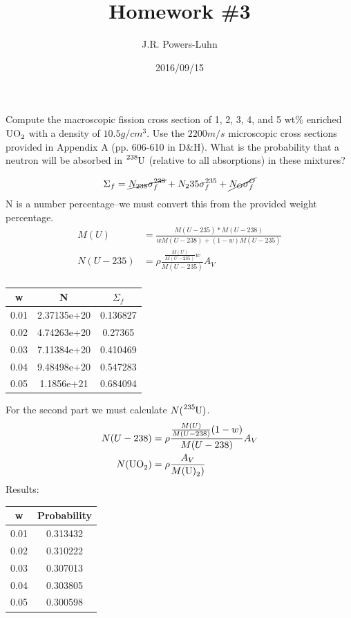 \documentclass{hw}
\author{J.R. Powers-Luhn}
\date{2016/09/15}
\title{Homework \#3}
\begin{document}
\problem{}
	Compute the macroscopic fission cross section of 1, 2, 3, 4, and 5 wt\% enriched $ \ce{UO_2} $ with a density of $ 10.5g/cm^3 $. Use the $ 2200 m/s $ microscopic cross sections provided in Appendix A (pp. 606-610 in D\&H). What is the probability that a neutron will be absorbed in $ \ce{^{238}U} $ (relative to all absorptions) in these mixtures?
\solution

	$$ \Sigma_f = \cancel{N_{238} \sigma_f^{238}} + N_235 \sigma_f^{235} + \cancel{N_O \sigma_f^O}$$
	N is a number percentage--we must convert this from the provided weight percentage.
	\begin{align*}
		M(U) &= \frac{M(U-235) * M(U-238)}{wM(U-238)+(1-w)M(U-235)} \\
		N(U-235) &= \rho \frac{\frac{M(U)}{M(U-235)}w}{M(U-235)} A_V \\
	\end{align*}
	\begin{table}[h]
		\begin{tabular}{|c|c|c|}
			\hline
			w & N & $\Sigma_f $ \\
			\hline
			0.01 &  2.37135e+20 & 0.136827 \\
			0.02 & 4.74263e+20 & 0.27365 \\
			0.03 & 7.11384e+20 & 0.410469 \\
			0.04 & 9.48498e+20 & 0.547283 \\
			0.05 & 1.1856e+21 & 0.684094 \\
			\hline
		\end{tabular}
	\end{table}
	For the second part we must calculate $N(\ce{^{235}U})$.
	\begin{align*}
		N(U-238) &= \rho \frac{\frac{M(U)}{M(U-238)}(1-w)}{M(U-238)} A_V \\
		N(\ce{UO_2}) &= \rho \frac{A_V}{M(\ce{U)_2})}
	\end{align*}
	Results:
	\begin{table}[h]
		\begin{tabular}{|c|c|}
			\hline
			w & Probability \\
			\hline
			0.01 & 0.313432 \\
			0.02 & 0.310222 \\
			0.03 & 0.307013 \\
			0.04 & 0.303805 \\
			0.05 & 0.300598 \\
			\hline
		\end{tabular}
	\end{table}
\end{document}
